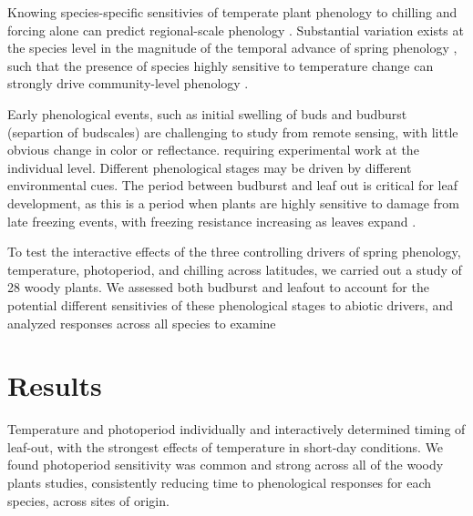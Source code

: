 \documentclass[11pt]{article}
\begin{document}

Knowing species-specific sensitivies of temperate plant phenology to chilling and forcing alone can predict regional-scale phenology \cite{Chuine:2000}. Substantial variation exists at the species level in the magnitude of the temporal advance of spring phenology \cite{Primack:2009aa}, such that the presence of species highly sensitive to temperature change can strongly drive community-level phenology \cite{Diez:2012}.

Early phenological events, such as initial swelling of buds and budburst (separtion of budscales) are challenging to study from remote sensing, with little obvious change in color or reflectance. 
requiring experimental work at the individual level. 
Different phenological stages may be driven by different environmental cues. The period between budburst and leaf out is critical for leaf development, as this is a period when plants are highly sensitive to damage from late freezing events, with freezing resistance increasing as leaves expand \cite{Sakai:1987aa}.

To test the interactive effects of the three controlling drivers of spring phenology, temperature, photoperiod, and chilling across latitudes, we carried out a study of 28 woody plants. We assessed both budburst and leafout to account for the potential different sensitivies of these phenological stages to abiotic drivers, and analyzed responses across all species to examine  

\section*{Results}

Temperature and photoperiod individually and interactively determined timing of leaf-out, with the strongest effects of temperature in short-day conditions. We found photoperiod sensitivity was common and strong across all of the woody plants studies, consistently reducing time to phenological responses for each species, across sites of origin. 
\end{document}
